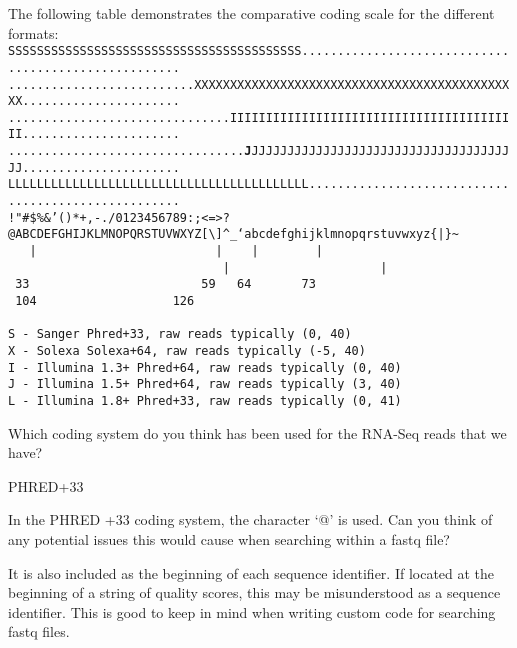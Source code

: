 \begin{minipage}{\textwidth}

The following table demonstrates the comparative coding scale for the different formats: \\

\scriptsize
\texttt{SSSSSSSSSSSSSSSSSSSSSSSSSSSSSSSSSSSSSSSSS..................................................... \\
..........................XXXXXXXXXXXXXXXXXXXXXXXXXXXXXXXXXXXXXXXXXXXXXX...................... \\
...............................IIIIIIIIIIIIIIIIIIIIIIIIIIIIIIIIIIIIIIIII...................... \\
.................................\textbf{J}JJJJJJJJJJJJJJJJJJJJJJJJJJJJJJJJJJJJJJ...................... \\
LLLLLLLLLLLLLLLLLLLLLLLLLLLLLLLLLLLLLLLLLL.................................................... \\
!"\#\$\%\&'()*+,-./0123456789:;\textless =\textgreater?@ABCDEFGHIJKLMNOPQRSTUVWXYZ[\textbackslash]\^{}_`abcdefghijklmnopqrstuvwxyz\{|\}\~{}} \\
\texttt{
~~|~~~~~~~~~~~~~~~~~~~~~~~~~|~~~~|~~~~~~~~|~~~~~~~~~~~~~~~~~~~~~~~~~~~~~~|~~~~~~~~~~~~~~~~~~~~~|~\\
~33~~~~~~~~~~~~~~~~~~~~~~~~59~~~64~~~~~~~73~~~~~~~~~~~~~~~~~~~~~~~~~~~~104~~~~~~~~~~~~~~~~~~~126~\\
~ \\
 S - Sanger        Phred+33,  raw reads typically (0, 40) \\
 X - Solexa        Solexa+64, raw reads typically (-5, 40) \\
 I - Illumina 1.3+ Phred+64,  raw reads typically (0, 40) \\ 
 J - Illumina 1.5+ Phred+64,  raw reads typically (3, 40) \\
 L - Illumina 1.8+ Phred+33,  raw reads typically (0, 41) \\
}
\end{minipage}

\begin{questions}
Which coding system do you think has been used for the RNA-Seq reads that we have? \\
\begin{answer}
PHRED+33\\
\end{answer}
In the PHRED +33 coding system, the character `@' is used.
Can you think of any potential issues this would cause when searching within a fastq file? \\
\begin{answer}
It is also included as the beginning of each sequence identifier.
If located at the beginning of a string of quality scores, this may be misunderstood as a sequence identifier.
This is good to keep in mind when writing custom code for searching fastq files.
\end{answer}
\end{questions}

